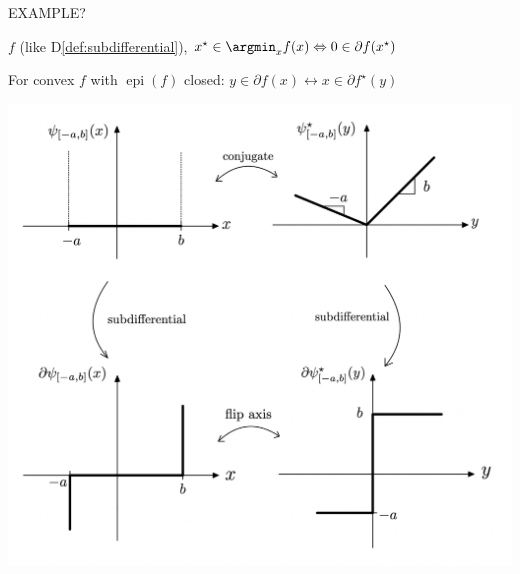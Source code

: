EXAMPLE?

\begin{proposition}[]
	$f$ (like D\ref{def:subdifferential}),
	$x^\star\in\argmin_x f(x)
		\Leftrightarrow
		0 \in\partial f(x^\star)$
\end{proposition}

\begin{proposition}
	For convex $f$ with $\operatorname{epi}(f)$ closed:
	$y \in \partial f(x) \leftrightarrow x \in \partial f^\star(y)$
\end{proposition}

%

\includegraphics[width=\columnwidth]{images/conjugate_subdiff.png}
